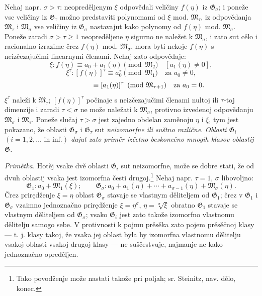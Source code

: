 \documentclass[11pt]{article}
\begin{document}
Nehaj napr. $\sigma>\tau$: neopreděljenym $\xi$ odpovědali veličiny
$f(\eta)$ iz $\mathfrak G_\sigma$; i poneže vse veličiny iz
$\mathfrak G_\tau$ možno predstaviti polynomami od $\xi$ mod.
$\mathfrak M_\tau$, iz odpovědanja $\mathfrak M_\tau$ i
$\mathfrak M_\sigma$ vse veličiny iz $\mathfrak G_\sigma$ nastavajut kako
polynomy od $f(\eta)$ mod. $\mathfrak M_\sigma$. Poneže zaradi
$\sigma>\tau\ge1$ neopreděljene $\eta$ sigurno ne naležet k
$\mathfrak M_\sigma$, i zato sut cělo i racionalno izrazime črez $f(\eta)$
mod. $\mathfrak M_\sigma$, mora byti nekoje $f(\eta)$ s neizčezajučimi
linearnymi členami. Nehaj zato odpovědaje:
\[
 \xi:f(\eta)\equiv a_0+a_1(\eta)\pmod{\mathfrak M_2}\quad[a_1(\eta)\ne0],
\]
\[
 \xi^\tau:[f(\eta)]^\tau\equiv a_0^\tau\pmod{\mathfrak M_1}\quad\text{za }a_0\ne0,
\]
\[
 \hphantom{\xi^\tau:[f(\eta)]^\tau}\equiv [a_1(\eta)]^\tau
 \pmod{\mathfrak M_{\tau+1}}\quad\text{za }a_0=0.
\]
$\xi^\tau$ naleži k $\mathfrak M_\tau$; $[f(\eta)]^\tau$ počinaje s
neizčezajučimi členami nultoj ili $\tau$-toj dimenzije i zaradi $\tau<\sigma$
ne može naležati k $\mathfrak M_\sigma$, protivno izvedenoj odpovědanju
$\mathfrak M_\sigma$ i $\mathfrak M_\tau$. Poneže slučaj $\tau>\sigma$ jest
zajedno obdelan zaměnoju $\eta$ i $\xi$, tym jest pokazano, že oblasti
$\mathfrak G_\sigma$ i $\mathfrak G_\tau$ sut {\itshape neizomorfne ili suštno
različne}. {\itshape Oblasti $\mathfrak G_i$
$(i=1,2,\ldots\text{ in inf.})$ dajut zato priměr izčetno beskonečno mnogih
klasov oblastij $\mathfrak G$.}

{\itshape Primětka.} Hotěj vsake dvě oblasti $\mathfrak G_i$ sut
neizomorfne, može se dobre stati, že od dvuh oblastij vsaka jest izomorfna
česti drugoj.\footnote{Tako povodženje može nastati takože pri poljah; sr.
Steinitz, nav. dělo, konec.} Nehaj napr. $\tau=1$, $\sigma$ libovoljno:
\[
\mathfrak G_1:a_0+\mathfrak M_1(\xi);\qquad
\mathfrak G_\sigma:a_0+a_1(\eta)+\cdots+a_{\sigma-1}(\eta)+\mathfrak M_\sigma(\eta).
\]
Črez prirędženje $\xi=\eta$ oblast $\mathfrak G_\sigma$ stavaje se vlastnym
děliteljem od $\mathfrak G_1$; črez v $\mathfrak G_1$ i
$\mathfrak G_\sigma$ vzaimno jednoznačno prirędženje $\xi=\eta^\sigma$,
$\eta=\sqrt[\sigma]{\xi}$ obratno $\mathfrak G_1$ stavaje se vlastnym
děliteljem od $\mathfrak G_\sigma$; vsako $\mathfrak G_i$ jest zato takože
izomorfno vlastnomu dělitelju samogo sebe. V protivnosti k pojmu prěsěka zato
pojem prěsěčnoj klasy --- t. j. klasy takoj, že vsaka jej oblast byla by
izomorfna vlastnomu dělitelju vsakoj oblasti vsakoj drugoj klasy --- ne
suščestvuje, najmanje ne kako jednoznačno opreděljen.
\end{document}
